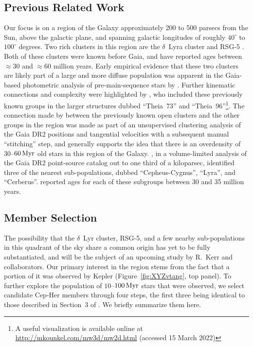\documentclass[12pt,twocolumn,linenumbers]{aastex63}
\begin{document}
\subsection{Previous Related Work}

Our focus is on a region of the Galaxy approximately 200 to 500
parsecs from the Sun, above the galactic plane, and spanning galactic
longitudes of roughly $40^\circ$ to $100^\circ$ degrees.  Two rich
clusters in this region are the $\delta$~Lyra cluster
\citep{stephenson_possible_1959} and RSG-5 \citep{roser_nine_2016}.
Both of these clusters were known before Gaia, and have reported ages
between $\approx$30 and $\approx$60 million years.  Early empirical
evidence that these two clusters are likely part of a large and more
diffuse population was apparent in the Gaia-based photometric analysis
of pre-main-sequence stars by \citet[][see their Figures~11
and~13]{Zari2018}.  Further kinematic connections and complexity were
highlighted by \citet{KounkelCovey2019}, who included these previously
known groups in the larger structures dubbed ``Theia~73'' and
``Theia~96''\footnote{A useful visualization is available online at
\url{http://mkounkel.com/mw3d/mw2d.html} (accessed 15 March 2022)}.
The connection made by \citet{KounkelCovey2019} between the previously
known open clusters and the other groups in the region was made as
part of an unsupervised clustering analysis of the Gaia DR2 positions
and tangential velocities with a subsequent manual ``stitching'' step,
and generally supports the idea that there is an overdensity of
$30$--$60\,{\rm Myr}$ old stars in this region of the Galaxy.
\citet{Kerr2021}, in a volume-limited analysis of the Gaia DR2
point-source catalog out to one third of a kiloparsec, identified
three of the nearest sub-populations, dubbed ``Cepheus-Cygnus'',
``Lyra'', and ``Cerberus''.  \citet{Kerr2021} reported ages for each
of these subgroups between 30 and 35 million years.


\subsection{Member Selection}
\label{subsec:members}

The possibility that the $\delta$~Lyr cluster, RSG-5, and a few nearby
sub-populations in this quadrant of the sky share a common origin has
yet to be fully substantiated, and will be the subject of an upcoming
study by R.~Kerr and collaborators.  Our primary interest in the
region stems from the fact that a portion of it was observed by Kepler
(Figure~\ref{fig:XYZvtang}, top panel).  To further explore the
population of $10$--$100\,{\rm Myr}$ stars that were observed, we
select candidate Cep-Her members through four steps, the first three
being identical to those described in Section~3 of \citet{Kerr2021}.
We briefly summarize them here.
\end{document}
